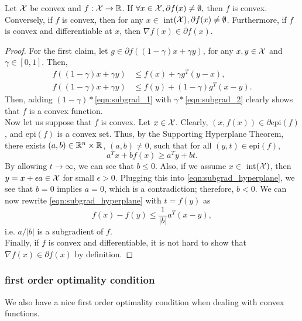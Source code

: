 \begin{proposition}
Let $\mathcal{X}$ be convex and $f : \mathcal{X} \rightarrow \mathbb{R}$. If $\forall x \in \mathcal{X}, \partial f(x) \neq \emptyset,$ then $f$ is convex. Conversely, if $f$ is convex, then for any $x \in $ int$(\mathcal{X}), \partial f(x) \neq \emptyset$. Furthermore, if $f$ is convex and differentiable at $x$, then $\nabla f(x) \in \partial f(x)$. 
\begin{proof}
For the first claim, let $g \in \partial f( (1 - \gamma) x + \gamma y)$, for any $x,y \in \mathcal{X}$ and $\gamma \in [0,1]$. Then,
\begin{align}
f((1 - \gamma) x + \gamma y) &\leq f(x) + \gamma g^T (y - x), \label{eqn:subgrad_1} \\
f((1 - \gamma) x + \gamma y) &\leq f(y) + (1 - \gamma) g^T (x - y). \label{eqn:subgrad_2}
\end{align}
Then, adding $(1 - \gamma) *$\eqref{eqn:subgrad_1} with $\gamma *$\eqref{eqn:subgrad_2} clearly shows that $f$ is a convex function. \\

Now let us suppose that $f$ is convex. Let $x \in \mathcal{X}$. Clearly, $(x, f(x)) \in \partial\mbox{epi}(f)$, and $\mbox{epi}(f)$ is a convex set. Thus, by the Supporting Hyperplane Theorem, there exists $(a, b) \in \mathbb{R}^n \times \mathbb{R}$, $(a, b) \neq 0$, such that for all $(y, t) \in \mbox{epi} (f)$, 
\begin{equation} \label{eqn:subgrad_hyperplane}
a^T x + b f(x) \geq a^T y + bt.
\end{equation}
By allowing $t \rightarrow \infty$, we can see that $b \leq 0$. Also, if we assume $x \in $ int$(\mathcal{X})$, then $y = x + \epsilon a \in \X$ for small $\epsilon > 0$. Plugging this into \eqref{eqn:subgrad_hyperplane}, we see that $b = 0$ implies $a = 0$, which is a contradiction; therefore, $b < 0$. We can now rewrite \eqref{eqn:subgrad_hyperplane} with $t = f(y)$ as 
\[
f(x) - f(y) \leq \frac{1}{|b|} a^T (x - y),
\]
i.e. $a / |b|$ is a subgradient of $f$. \\

Finally, if $f$ is convex and differentiable, it is not hard to show that $\nabla f(x) \in \partial f(x)$ by definition. 
\end{proof}
\end{proposition}

\subsubsection{first order optimality condition}
We also have a nice first order optimality condition when dealing with convex functions.

